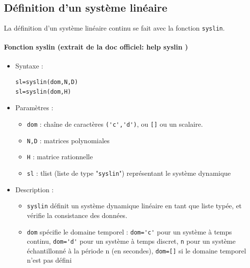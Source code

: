 \subsection{Définition d'un système linéaire}
La définition d'un système linéaire continu se fait avec la fonction 
\verb?syslin?. 

\begin{doc}
\paragraph{Fonction syslin (extrait de la doc officiel: help syslin )}
    \begin{itemize}
        \item Syntaxe :
        \begin{code}
\begin{verbatim}
sl=syslin(dom,N,D)
sl=syslin(dom,H)
\end{verbatim}
        \end{code}
        \item Paramètres :
            \begin{itemize}
                \item \verb?dom? : chaîne de caractères \verb?('c','d')?, 
                      ou \verb?[]? ou un scalaire.
                \item \verb?N,D? : matrices polynomiales
                \item \verb?H?   : matrice rationnelle
                \item \verb?sl?  : tlist (liste de type "\verb?syslin?") 
                      représentant le système dynamique
            \end{itemize}
        \item Description : 
            \begin{itemize}
                \item \verb?syslin? définit un système dynamique linéaire en 
                      tant que liste typée, et vérifie la consistance des 
                      données.
                \item \verb?dom? spécifie le domaine temporel :
                      \verb?dom='c'? pour un système à temps continu, 
                      \verb?dom='d'? pour un système à temps discret, 
                      \verb?n? pour un système échantillonné à la période n 
                      (en secondes), 
                      \verb?dom=[]? si le domaine temporel n'est pas défini
            \end{itemize}
    \end{itemize}
\end{doc}

